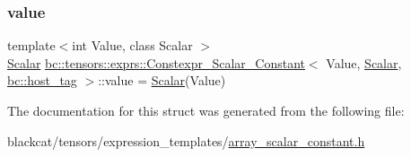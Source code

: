 \subsubsection{\texorpdfstring{value}{value}}
{\footnotesize\ttfamily template$<$int Value, class Scalar $>$ \\
\hyperlink{namespacebc_aa12ac55ee2c43dc082894dd3859daee1}{Scalar} \hyperlink{structbc_1_1tensors_1_1exprs_1_1Constexpr__Scalar__Constant}{bc\+::tensors\+::exprs\+::\+Constexpr\+\_\+\+Scalar\+\_\+\+Constant}$<$ Value, \hyperlink{namespacebc_aa12ac55ee2c43dc082894dd3859daee1}{Scalar}, \hyperlink{structbc_1_1host__tag}{bc\+::host\+\_\+tag} $>$\+::value = \hyperlink{namespacebc_aa12ac55ee2c43dc082894dd3859daee1}{Scalar}(Value)}



The documentation for this struct was generated from the following file\+:\begin{DoxyCompactItemize}
\item 
blackcat/tensors/expression\+\_\+templates/\hyperlink{array__scalar__constant_8h}{array\+\_\+scalar\+\_\+constant.\+h}\end{DoxyCompactItemize}
